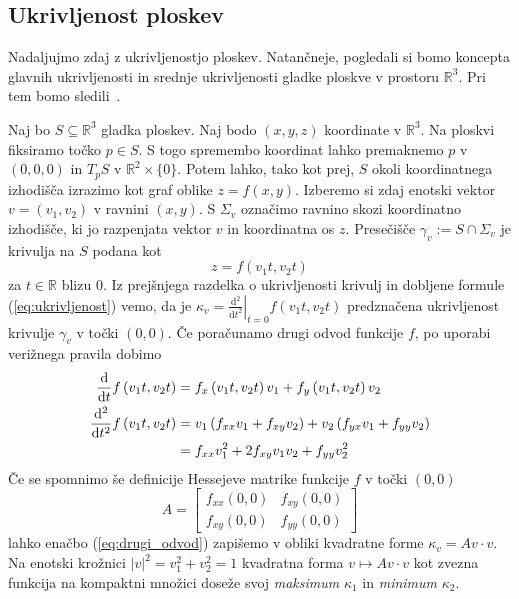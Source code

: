 \documentclass[fin1, tisk, bibtex]{fmfdelo}
\begin{document}
\subsection{Ukrivljenost ploskev}

Nadaljujmo zdaj z ukrivljenostjo ploskev. Natančneje, pogledali si bomo koncepta glavnih ukrivljenosti in srednje ukrivljenosti gladke ploskve v prostoru $\mathbb{R}^3$. Pri tem bomo sledili~\cite[Razdelek 3]{fosternicmin}.

Naj bo $S \subseteq \mathbb{R}^3$ gladka ploskev. Naj bodo $(x, y, z)$ koordinate v $\mathbb{R}^3$. Na ploskvi fiksiramo točko $p \in S$. S togo spremembo koordinat lahko premaknemo $p$ v $(0,0,0)$ in $T_p S$ v $\mathbb{R}^2 \times\{0\}$. Potem lahko, tako kot prej, $S$ okoli koordinatnega izhodišča izrazimo kot graf oblike $z=f(x, y)$. Izberemo si zdaj enotski vektor $v=\left(v_1, v_2\right)$ v ravnini $(x,y)$. S $\Sigma_v$ označimo ravnino skozi koordinatno izhodišče, ki jo razpenjata vektor $v$ in koordinatna os $z$. Presečišče $\gamma_v:=S \cap \Sigma_v$ je krivulja na $S$ podana kot
\begin{equation*}
    z=f\left(v_1 t, v_2 t\right)
\end{equation*}
za $t \in \mathbb{R}$ blizu $0$. Iz prejšnjega razdelka o ukrivljenosti krivulj in dobljene formule (\ref{eq:ukrivljenost}) vemo, da je $\kappa_v=\left.\frac{\mathrm{d}^2}{\mathrm{d} t^2}\right|_{t=0} f\left(v_1 t, v_2 t\right)$ predznačena ukrivljenost krivulje $\gamma_v$ v točki $(0,0)$. Če poračunamo drugi odvod funkcije $f$, po uporabi verižnega pravila dobimo
\begin{align}
    \frac{\mathrm{d}}{\mathrm{d} t}f\left(v_1 t, v_2 t\right) &= f_x\left(v_1 t, v_2 t\right) v_1 + f_y\left(v_1 t, v_2 t\right) v_2 \notag \\
    \frac{\mathrm{d}^2}{\mathrm{d} t^2}f\left(v_1 t, v_2 t\right) &= v_1\left(f_{x x} v_1 + f_{x y} v_2\right) + v_2\left(f_{y x} v_1 + f_{y y} v_2\right) \notag \\
    &= f_{x x} v_1^2 + 2 f_{x y} v_1 v_2 + f_{y y} v_2^2 \label{eq:drugi_odvod}
\end{align}
Če se spomnimo še definicije Hessejeve matrike funkcije $f$ v točki $(0,0)$ 
\begin{equation}
    A=\begin{bmatrix}
        f_{x x}(0,0) & f_{x y}(0,0) \\
        f_{x y}(0,0) & f_{y y}(0,0)
    \end{bmatrix} \label{eq:hessejeva}
\end{equation}
lahko enačbo (\ref{eq:drugi_odvod}) zapišemo v obliki kvadratne forme $\kappa_v= A v \cdot v$. Na enotski krožnici $|v|^2=v_1^2+v_2^2=1$ kvadratna forma $v \mapsto A v \cdot v$ kot zvezna funkcija na kompaktni množici doseže svoj \emph{maksimum} $\kappa_1$ in \emph{minimum} $\kappa_2$.
\end{document}
